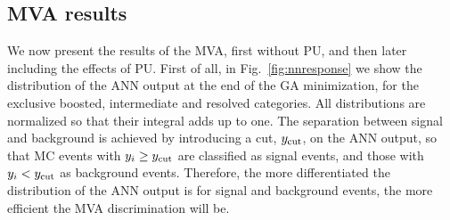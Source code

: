 \subsection{MVA results}
\label{sec:signalsignificance}

We now present the results of the MVA, first without PU, and then
later including the effects of PU.
%
First of all, in Fig.~\ref{fig:nnresponse} we show the distribution of
the ANN output at the end of the GA minimization, for the exclusive
boosted, intermediate and resolved categories.
%
All distributions are normalized so that their integral
  adds up to one.
%
The  separation between signal and background is achieved by introducing
a cut, $y_{\rm cut}$, on the ANN output, so that MC events with $y_i\ge
y_{\rm cut}$ are classified as signal events, and those with
 $y_i <
y_{\rm cut}$ as background events.
%
Therefore,
the more differentiated the distribution of the ANN output is
for signal and background events, the more efficient
the MVA discrimination will be.

